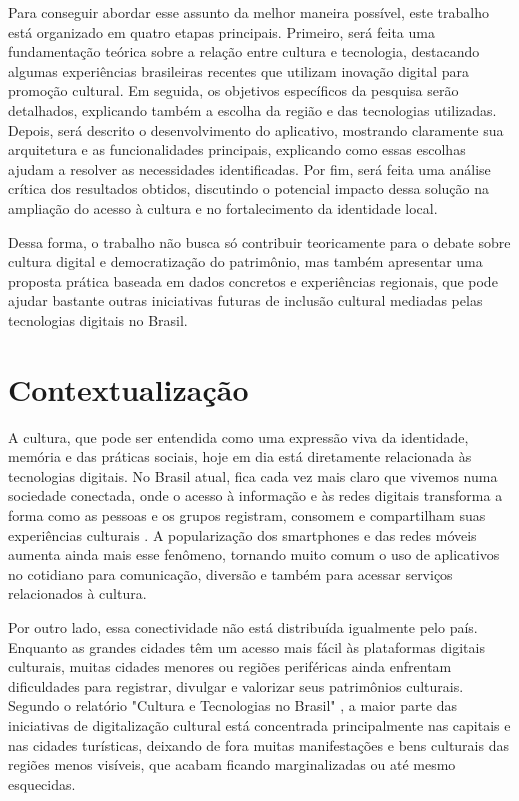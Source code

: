 Para conseguir abordar esse assunto da melhor maneira possível, este trabalho está organizado em quatro etapas principais. Primeiro, será feita uma fundamentação teórica sobre a relação entre cultura e tecnologia, destacando algumas experiências brasileiras recentes que utilizam inovação digital para promoção cultural. Em seguida, os objetivos específicos da pesquisa serão detalhados, explicando também a escolha da região e das tecnologias utilizadas. Depois, será descrito o desenvolvimento do aplicativo, mostrando claramente sua arquitetura e as funcionalidades principais, explicando como essas escolhas ajudam a resolver as necessidades identificadas. Por fim, será feita uma análise crítica dos resultados obtidos, discutindo o potencial impacto dessa solução na ampliação do acesso à cultura e no fortalecimento da identidade local.

Dessa forma, o trabalho não busca só contribuir teoricamente para o debate sobre cultura digital e democratização do patrimônio, mas também apresentar uma proposta prática baseada em dados concretos e experiências regionais, que pode ajudar bastante outras iniciativas futuras de inclusão cultural mediadas pelas tecnologias digitais no Brasil.


\section{Contextualização}

A cultura, que pode ser entendida como uma expressão viva da identidade, memória e das práticas sociais, hoje em dia está diretamente relacionada às tecnologias digitais. No Brasil atual, fica cada vez mais claro que vivemos numa sociedade conectada, onde o acesso à informação e às redes digitais transforma a forma como as pessoas e os grupos registram, consomem e compartilham suas experiências culturais \cite{nic-cultura-tecnologias-no-brasil}. A popularização dos smartphones e das redes móveis aumenta ainda mais esse fenômeno, tornando muito comum o uso de aplicativos no cotidiano para comunicação, diversão e também para acessar serviços relacionados à cultura.

Por outro lado, essa conectividade não está distribuída igualmente pelo país. Enquanto as grandes cidades têm um acesso mais fácil às plataformas digitais culturais, muitas cidades menores ou regiões periféricas ainda enfrentam dificuldades para registrar, divulgar e valorizar seus patrimônios culturais. Segundo o relatório "Cultura e Tecnologias no Brasil" \cite{nic-cultura-tecnologias-no-brasil}, a maior parte das iniciativas de digitalização cultural está concentrada principalmente nas capitais e nas cidades turísticas, deixando de fora muitas manifestações e bens culturais das regiões menos visíveis, que acabam ficando marginalizadas ou até mesmo esquecidas.

